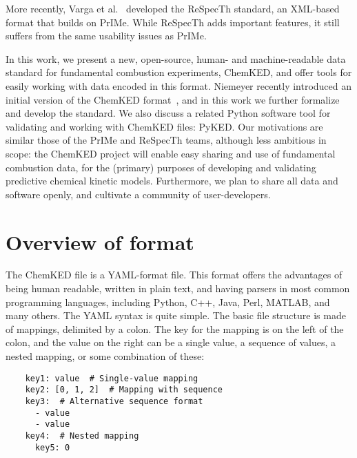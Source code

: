 \documentclass[12pt]{ussci}
\newcommand\ck{ChemKED}
\newcommand\pk{PyKED}
\begin{document}
More recently, Varga et al.~\autocite{Varga2015a,Varga2015b} developed the ReSpecTh standard,
an XML-based format that builds on PrIMe. While ReSpecTh adds important features, it still
suffers from the same usability issues as PrIMe.

In this work, we present a new, open-source, human- and machine-readable data standard for fundamental combustion
experiments, \ck{}, and offer tools for easily working with data encoded in this format.
Niemeyer recently introduced an initial version of the \ck{} format~\autocite{Niemeyer:2016wf},
and in this work we further formalize and develop the standard. We also discuss a related
Python software tool for validating and working with \ck{} files: \pk{}.
Our motivations are similar those of the PrIMe and ReSpecTh teams, although
less ambitious in scope: the \ck{} project will enable easy sharing and use of fundamental combustion data, for the (primary) purposes of
developing and validating predictive chemical kinetic models.
Furthermore, we plan to share all data and software openly, and cultivate a community of
user-developers.


\section{Overview of format}\label{sec:overview-of-format}

The \ck{} file is a YAML-format file. This format offers the advantages of being
human readable, written in plain text, and having parsers in most common
programming languages, including Python, C++, Java, Perl, MATLAB, and many
others. The YAML syntax is quite simple. The basic file structure is made of
mappings, delimited by a colon. The key for the mapping is on the left of the
colon, and the value on the right can be a single value, a sequence of values,
a nested mapping, or some combination of these:

\begin{verbatim}
    key1: value  # Single-value mapping
    key2: [0, 1, 2]  # Mapping with sequence
    key3:  # Alternative sequence format
      - value
      - value
    key4:  # Nested mapping
      key5: 0
\end{verbatim}
\end{document}
